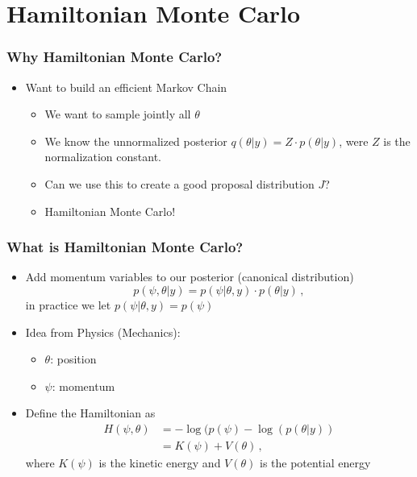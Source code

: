 \documentclass[10pt]{beamer}
\newcommand{\uured}[1]{\textcolor{uured}{#1}}
\begin{document}

\section{Hamiltonian Monte Carlo}
\frame{\sectionpage}

\begin{frame}
\frametitle{Why Hamiltonian Monte Carlo?}

\begin{itemize}
\item Want to build an \uured{efficient} Markov Chain
\begin{itemize}
\item We want to sample jointly all $\theta$
\item We know the \uured{unnormalized} posterior $q(\theta|y)=Z \cdot p(\theta|y)$, were $Z$ is the normalization constant.
\item Can we use this to create a good \uured{proposal} distribution $J$?
\pause
\item \uured{Hamiltonian Monte Carlo}!
\end{itemize}
\end{itemize}

\end{frame}


\begin{frame}
\frametitle{What is Hamiltonian Monte Carlo?}

\begin{itemize}
\item Add momentum variables to our posterior (\uured{canonical} distribution)
\[
 p(\psi,\theta | y) = p(\psi | \theta , y) \cdot p(\theta | y)\,,
\]
in practice we let $p(\psi | \theta , y) = p(\psi)$
\pause
\item Idea from Physics (Mechanics):
\begin{itemize}
\item $\theta$: position
\item $\psi$: momentum
\end{itemize}
\pause
\item Define the Hamiltonian as
\begin{align}
H(\psi, \theta)  & = - \log(p(\psi) - \log(p(\theta | y))\\
 & = K(\psi) + V(\theta)\,,
\end{align}
where $K(\psi)$ is the \uured{kinetic} energy and $V(\theta)$ is the \uured{potential} energy
\end{itemize}
\end{frame}
\end{document}
